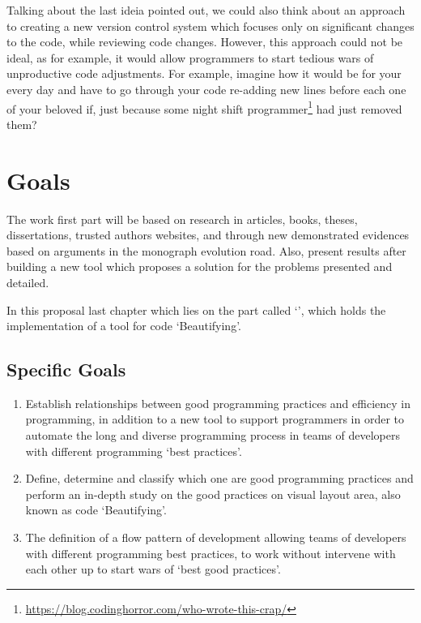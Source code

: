 \begin{englishtext}
    Talking about the last ideia pointed out, we could also think about an
    approach to creating a new version control system which focuses only on
    significant changes to the code, while reviewing code changes. However, this
    approach could not be ideal, as for example, it would allow programmers to
    start tedious wars of unproductive code adjustments. For example, imagine
    how it would be for your every day and have to go through your code
    re-adding new lines before each one of your beloved if\s, just because some
    night shift programmer\footnote{\url{https://blog.codinghorror.com/who-wrote-this-crap/}}
    had just removed them?



    \section{Goals}

    The work first part will be based on research in
    articles, books, theses, dissertations, trusted authors websites,
    and through new demonstrated evidences based on arguments
    in the monograph evolution road.
    Also, present results after building a new tool
    which proposes a solution for the problems presented and detailed.

    In this proposal last chapter which lies on the part
    called `', which holds the implementation of a
    tool for code `Beautifying'.


    \subsection{Specific Goals}

    \begin{enumerate}

        \item Establish relationships between good programming practices and efficiency in
        programming, in addition to a new tool to support programmers in order to
        automate the long and diverse programming process in teams of developers
        with different programming `best practices'.

        \item Define, determine and classify which one are good programming
        practices and perform an in-depth study on the good practices on visual
        layout area, also known as code `Beautifying'.

        \item The definition of a flow pattern of development allowing teams of
        developers with different programming best practices, to work without
        intervene with each other up to start wars of `best good practices'.


\end{enumerate}
\end{englishtext}
